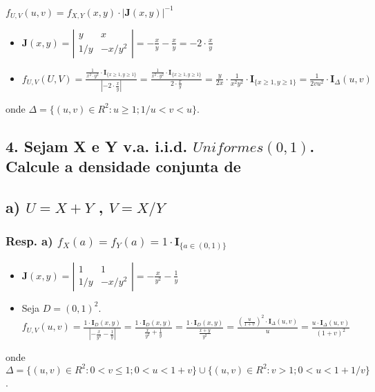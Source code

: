 \documentclass[portuguese]{article}
\begin{document}
$f_{U,V}(u,v)=f_{X,Y}(x,y)\cdot\left|\mathbf{J}(x,y)\right|^{-1}$
\begin{itemize}
\item $\mathbf{J}(x,y)=\left|\begin{array}{cc}
y & x\\
1/y & -x/y^{2}
\end{array}\right|=-\frac{x}{y}-\frac{x}{y}=-2\cdot\frac{x}{y}$
\item $f_{U,V}(U,V)=\frac{\frac{1}{x^{2}\cdot y^{2}}\cdot\mathbf{I}_{\{x\ge1,y\ge1\}}}{\left|-2\cdot\frac{x}{y}\right|}=\frac{\frac{1}{x^{2}\cdot y^{2}}\cdot\mathbf{I}_{\{x\ge1,y\ge1\}}}{2\cdot\frac{x}{y}}=\frac{y}{2x}\cdot\frac{1}{x^{2}y^{2}}\cdot\mathbf{I}_{\{x\ge1,y\ge1\}}=\frac{1}{2vu^{2}}\cdot\mathbf{I}_{\Delta}(u,v)$
\end{itemize}
onde $\Delta=\{ (u,v)\in R^2: u\geq 1; 1/u <v<u\}$.
\subsection*{\textcompwordmark{}}


\subsection*{\textmd{4. Sejam X e Y v.a. i.i.d. $Uniformes(0,1)$. Calcule a densidade
conjunta de}}


\subsection*{\textmd{a) $U=X+Y$ , $V=X/Y$ }}


\subsubsection*{\textmd{Resp}. \textmd{a) $f_{X}(a)=f_{Y}(a)=1\cdot\mathbf{I}_{\{a\in(0,1)\}}$}}
\begin{itemize}
\item $\mathbf{J}(x,y)=\left|\begin{array}{cc}
1 & 1\\
1/y & -x/y^{2}
\end{array}\right|=-\frac{x}{y^{2}}-\frac{1}{y}$
\item Seja $D=(0,1)^2$. $f_{U,V}(u,v)=\frac{1\cdot\mathbf{I}_{D}(x,y)}{\left|-\frac{x}{y^{2}}-\frac{1}{y}\right|}=\frac{1\cdot\mathbf{I}_{D}(x,y)}{\frac{x}{y^{2}}+\frac{1}{y}}=\frac{1\cdot\mathbf{I}_{D}(x,y)}{\frac{x+y}{y^{2}}}=\frac{(\frac{u}{1+v})^{2}\cdot\mathbf{I}_{\Delta}(u,v)}{u}=\frac{u\cdot\mathbf{I}_{\Delta}(u,v)}{(1+v)^{2}}$ 
\end{itemize}
onde $\Delta=\{ (u,v)\in R^2: 0<v\leq1; 0<u<1+v \}\cup\{(u,v)\in R^2: v>1; 0< u<1+1/v \}$.
\end{document}
